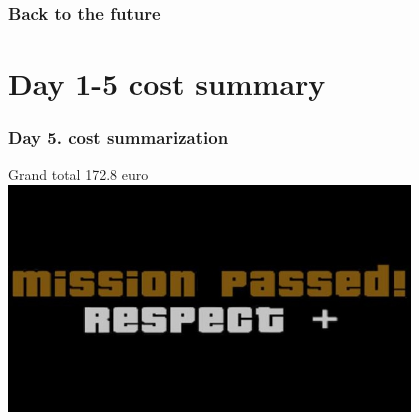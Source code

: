 \documentclass{beamer}
\begin{document}
	\begin{frame}
		\frametitle{Back to the future}

	\end{frame}

	\section{Day 1-5 cost summary}

	\begin{frame}
		\frametitle{Day 5. cost summarization}

		\centering
		Grand total 172.8 euro\\[1em]
		
		\pause
		\includegraphics[width=0.8\textwidth]{mission}
	\end{frame}	
	
\end{document}
